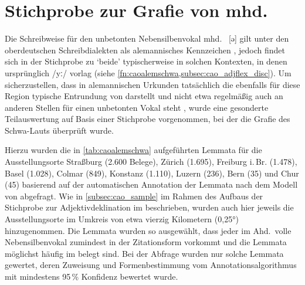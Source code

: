 
\section{Stichprobe zur Grafie von mhd.\ }
\label{sec:caoalemschwa}

Die Schreibweise  für den unbetonten Nebensilbenvokal mhd.~ [ə]
gilt unter den ober\-deutschen Schreibdialekten als alemannisches Kennzeichen
\autocites[vgl.][25]{weinhold1863}[75]{weinhold1883}[41, 113]{paul2007}, jedoch
findet sich  in der Stichprobe zu  `beide' typischerweise
in solchen Kontexten, in denen ursprünglich  /yː/ vorlag (siehe
\cref{fn:caoalemschwa,subsec:cao_adjflex_disc}). Um sicherzustellen, dass
 in alemannischen Urkunden tatsächlich die ebenfalls für diese Region
typische Entrundung von  darstellt und nicht etwa regelmäßig auch an
anderen Stellen für einen unbetonten Vokal steht
\autocites%
	[466--467]{schirmunski1962}%
	[41]{paul2007}%
	[305]{ksw2}%
	[vgl.~auch][131--132]{boesch1946}%
, wurde eine gesonderte Teilauswertung auf Basis einer Stichprobe vorgenommen,
bei der die Grafie des Schwa-Lauts überprüft wurde.

Hierzu wurden die in \cref{tab:caoalemschwa} aufgeführten Lemmata für die
Ausstellungsorte
Straßburg (2.600 Belege),
% 
Zürich (1.695),
% 
Freiburg i.\,Br. (1.478),
% 
Basel (1.028),
% 
Colmar (849),
% 
Konstanz (1.110),
% 
Luzern (236),
% 
Bern (35)
% 
und Chur (45)
% 
basierend auf der automatischen Annotation der Lemmata nach dem Modell von
\citet{schmid2019} abgefragt. Wie in \cref{subsec:cao_sample} im Rahmen des
Aufbaus der Stichprobe zur Adjektivdeklination im \CAO{} beschrieben, wurden
auch hier jeweils die Ausstellungsorte im Umkreis von etwa vierzig Kilometern
(0,25°) hinzugenommen. Die Lemmata wurden so ausgewählt, dass jeder im Ahd.\
volle Nebensilbenvokal zumindest in der Zitationsform vorkommt und die Lemmata
möglichst häufig im \CAO{} belegt sind. Bei der Abfrage wurden nur solche
Lemmata gewertet, deren Zuweisung und Formenbestimmung vom
Annotations\-algorithmus mit mindestens 95\,\% Konfidenz bewertet wurde.

